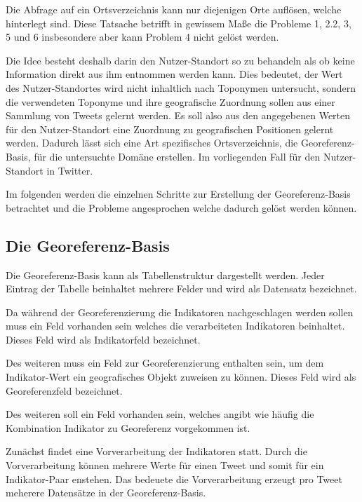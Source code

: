 				Die Abfrage auf ein Ortsverzeichnis kann nur diejenigen Orte auflösen, welche hinterlegt sind. 
				Diese Tatsache betrifft in gewissem Maße die Probleme 1, 2.2, 3, 5 und 6 insbesondere aber kann Problem 4 nicht gelöst werden.

				Die Idee besteht deshalb darin den Nutzer-Standort so zu behandeln als ob keine Information direkt aus ihm entnommen werden kann.
				Dies bedeutet, der Wert des Nutzer-Standortes wird nicht inhaltlich nach Toponymen untersucht, sondern die verwendeten Toponyme und ihre geografische Zuordnung sollen aus einer Sammlung von Tweets gelernt werden.
				Es soll also aus den angegebenen Werten für den Nutzer-Standort eine Zuordnung zu geografischen Positionen gelernt werden. 
				Dadurch lässt sich eine Art spezifisches Ortsverzeichnis, die Georeferenz-Basis, für die untersuchte Domäne erstellen.
				Im vorliegenden Fall für den Nutzer-Standort in Twitter.
				
				Im folgenden werden die einzelnen Schritte zur Erstellung der Georeferenz-Basis betrachtet und die Probleme angesprochen welche dadurch gelöst werden können.


			\subsection{Die Georeferenz-Basis} 

				Die Georeferenz-Basis kann als Tabellenstruktur dargestellt werden. 
				Jeder Eintrag der Tabelle beinhaltet mehrere Felder und wird als Datensatz bezeichnet.

				Da während der Georeferenzierung die Indikatoren nachgeschlagen werden sollen muss ein Feld vorhanden sein welches die verarbeiteten Indikatoren beinhaltet.
				Dieses Feld wird als Indikatorfeld bezeichnet. 

				Des weiteren muss ein Feld zur Georeferenzierung enthalten sein, um dem Indikator-Wert ein geografisches Objekt zuweisen zu können. 
				Dieses Feld wird als Georeferenzfeld bezeichnet. 

				Des weiteren soll ein Feld vorhanden sein, welches angibt wie häufig die Kombination Indikator zu Georeferenz vorgekommen ist. 
				  

				Zunächst findet eine Vorverarbeitung der Indikatoren statt. 
				Durch die Vorverarbeitung können mehrere Werte für einen Tweet und somit für ein Indikator-Paar enstehen. 
				Das bedeuete die Vorverarbeitung erzeugt pro Tweet meherere Datensätze in der Georeferenz-Basis.

